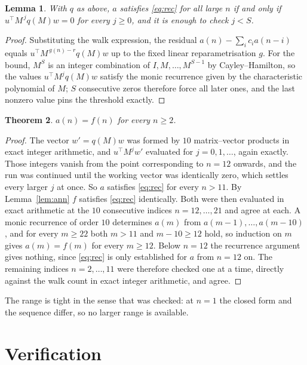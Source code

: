 \documentclass[11pt,a4paper]{article}
\theoremstyle{plain}
\newtheorem{theorem}{Theorem}
\newtheorem{lemma}[theorem]{Lemma}
\theoremstyle{definition}
\begin{document}
\begin{lemma}\label{lem:crit}
With $q$ as above, $a$ satisfies \eqref{eq:rec} for all large $n$ if and only if
$u^{\!\top}M^{\,j}q(M)w=0$ for every $j\ge0$, and it is enough to check $j<S$.
\end{lemma}

\begin{proof}
Substituting the walk expression, the residual $a(n)-\sum_ic_ia(n-i)$ equals
$u^{\!\top}M^{\,g(n)-r}q(M)w$ up to the fixed linear reparametrisation $g$. For the bound,
$M^{S}$ is an integer combination of $I,M,\dots,M^{S-1}$ by Cayley--Hamilton, so the values
$u^{\!\top}M^{j}q(M)w$ satisfy the monic recurrence given by the characteristic polynomial of
$M$; $S$ consecutive zeros therefore force all later ones, and the last nonzero value pins the
threshold exactly.
\end{proof}

\begin{theorem}
$a(n)=f(n)$ for every $n\ge2$.
\end{theorem}

\begin{proof}
The vector $w'=q(M)w$ was formed by $10$ matrix--vector products in exact integer
arithmetic, and $u^{\!\top}M^{j}w'$ evaluated for $j=0,1,\dots$, again exactly. Those integers
vanish from the point corresponding to $n=12$ onwards, and the run was continued until the
working vector was identically zero, which settles every larger $j$ at once. So $a$ satisfies
\eqref{eq:rec} for every $n>11$. By Lemma~\ref{lem:ann} $f$ satisfies \eqref{eq:rec}
identically. Both were then evaluated in exact arithmetic at the $10$ consecutive indices
$n=12,\dots,21$ and agree at each. A monic recurrence of order $10$
determines $a(m)$ from $a(m-1),\dots,a(m-10)$, and for every $m\ge22$ both
$m>11$ and $m-10\ge12$ hold, so induction on $m$ gives $a(m)=f(m)$ for every
$m\ge12$.
Below $n=12$ the recurrence argument gives nothing, since \eqref{eq:rec} is only
established for $a$ from $n=12$ on. The remaining indices $n=2,\dots,11$ were
therefore checked one at a time, directly against the walk count in exact integer arithmetic,
and agree.
\end{proof}

The range is tight in the sense that was checked: at $n=1$ the closed form and the sequence differ, so no larger range is available.

\section{Verification}
\end{document}
